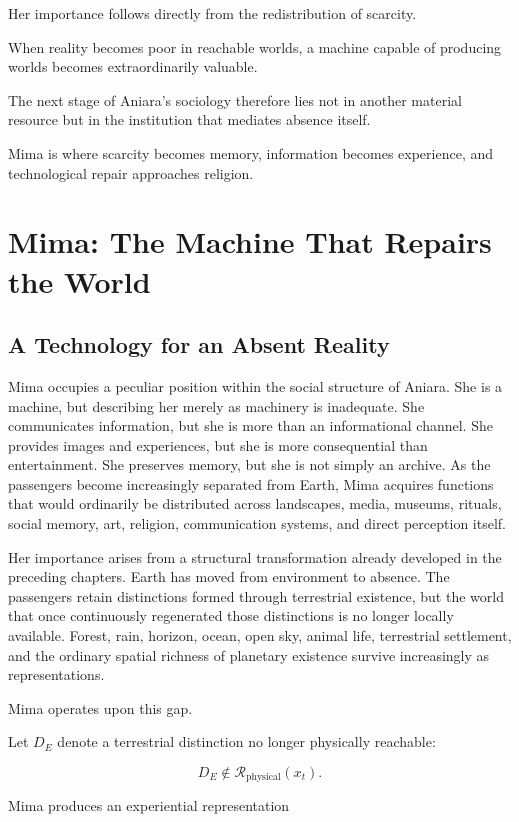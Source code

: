 \documentclass[11pt,oneside]{book}
\theoremstyle{definition}
\theoremstyle{remark}
\newcommand{\R}{\mathcal{R}}
\begin{document}
Her importance follows directly from the redistribution of scarcity.

When reality becomes poor in reachable worlds, a machine capable of producing worlds becomes extraordinarily valuable.

The next stage of Aniara's sociology therefore lies not in another material resource but in the institution that mediates absence itself.

Mima is where scarcity becomes memory, information becomes experience, and technological repair approaches religion.

\chapter{Mima: The Machine That Repairs the World}

\section{A Technology for an Absent Reality}

Mima occupies a peculiar position within the social structure of Aniara. She is a machine, but describing her merely as machinery is inadequate. She communicates information, but she is more than an informational channel. She provides images and experiences, but she is more consequential than entertainment. She preserves memory, but she is not simply an archive. As the passengers become increasingly separated from Earth, Mima acquires functions that would ordinarily be distributed across landscapes, media, museums, rituals, social memory, art, religion, communication systems, and direct perception itself.

Her importance arises from a structural transformation already developed in the preceding chapters. Earth has moved from environment to absence. The passengers retain distinctions formed through terrestrial existence, but the world that once continuously regenerated those distinctions is no longer locally available. Forest, rain, horizon, ocean, open sky, animal life, terrestrial settlement, and the ordinary spatial richness of planetary existence survive increasingly as representations.

Mima operates upon this gap.

Let \(D_E\) denote a terrestrial distinction no longer physically reachable:

\[
D_E\notin\R_{\mathrm{physical}}(x_t).
\]

Mima produces an experiential representation
\end{document}
